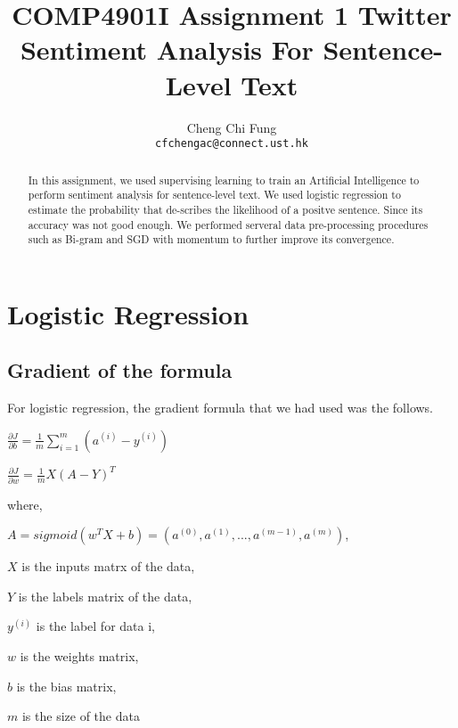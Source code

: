 \documentclass{article}
\title{COMP4901I Assignment 1 Twitter Sentiment Analysis For Sentence-Level Text}
\author{%
	Cheng Chi Fung \\
	\texttt{cfchengac@connect.ust.hk} \\
}
\begin{document}
\maketitle

\begin{abstract}
  In this assignment, we used supervising learning to train an Artificial Intelligence to perform sentiment analysis for sentence-level text. We used logistic regression to estimate the probability that de-scribes the likelihood of a positve sentence. Since its accuracy was not good enough. We performed serveral data pre-processing procedures such as Bi-gram and SGD with momentum to further improve its convergence.
  
\end{abstract}

\section{Logistic Regression}

\subsection{Gradient of the formula}

For logistic regression, the gradient formula that we had used was the follows.

$\frac{\partial J}{\partial b} = \frac{1}{m} \sum_{i=1}^m (a^{(i)}-y^{(i)})$

$\frac{\partial J}{\partial w} = \frac{1}{m}X(A-Y)^T$

where,

$A = sigmoid(w^T X + b) = (a^{(0)}, a^{(1)}, ..., a^{(m-1)}, a^{(m)})$,

$X$ is the inputs matrx of the data, 

$Y$ is the labels matrix of the data,

$y^{(i)}$ is the label for data i,

$w$ is the weights matrix,
 
$b$ is the bias matrix,  
 
$m$ is the size of the data
\end{document}
